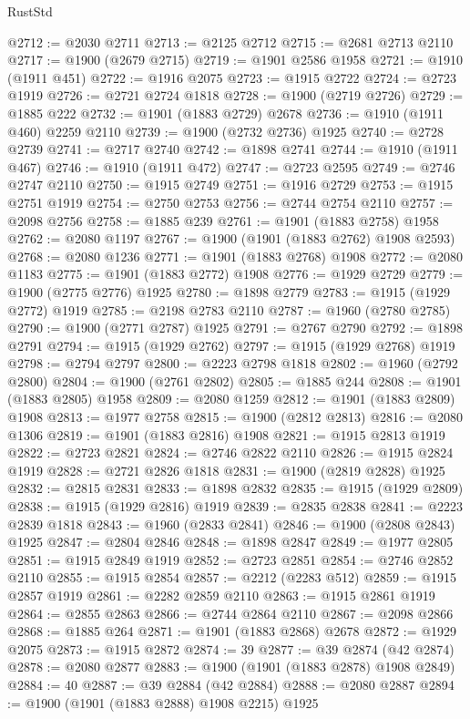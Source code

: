 \begin{lexlean}{RustStd}
\begin{coremodule}
@2712 := @2030 @2711
@2713 := @2125 @2712
@2715 := @2681 @2713 @2110
@2717 := @1900 (@2679 @2715)
@2719 := @1901 @2586 @1958
@2721 := @1910 (@1911 @451)
@2722 := @1916 @2075
@2723 := @1915 @2722
@2724 := @2723 @1919
@2726 := @2721 @2724 @1818
@2728 := @1900 (@2719 @2726)
@2729 := @1885 @222
@2732 := @1901 (@1883 @2729) @2678
@2736 := @1910 (@1911 @460) @2259 @2110
@2739 := @1900 (@2732 @2736) @1925
@2740 := @2728 @2739
@2741 := @2717 @2740
@2742 := @1898 @2741
@2744 := @1910 (@1911 @467)
@2746 := @1910 (@1911 @472)
@2747 := @2723 @2595
@2749 := @2746 @2747 @2110
@2750 := @1915 @2749
@2751 := @1916 @2729
@2753 := @1915 @2751 @1919
@2754 := @2750 @2753
@2756 := @2744 @2754 @2110
@2757 := @2098 @2756
@2758 := @1885 @239
@2761 := @1901 (@1883 @2758) @1958
@2762 := @2080 @1197
@2767 := @1900 (@1901 (@1883 @2762) @1908 @2593)
@2768 := @2080 @1236
@2771 := @1901 (@1883 @2768) @1908
@2772 := @2080 @1183
@2775 := @1901 (@1883 @2772) @1908
@2776 := @1929 @2729
@2779 := @1900 (@2775 @2776) @1925
@2780 := @1898 @2779
@2783 := @1915 (@1929 @2772) @1919
@2785 := @2198 @2783 @2110
@2787 := @1960 (@2780 @2785)
@2790 := @1900 (@2771 @2787) @1925
@2791 := @2767 @2790
@2792 := @1898 @2791
@2794 := @1915 (@1929 @2762)
@2797 := @1915 (@1929 @2768) @1919
@2798 := @2794 @2797
@2800 := @2223 @2798 @1818
@2802 := @1960 (@2792 @2800)
@2804 := @1900 (@2761 @2802)
@2805 := @1885 @244
@2808 := @1901 (@1883 @2805) @1958
@2809 := @2080 @1259
@2812 := @1901 (@1883 @2809) @1908
@2813 := @1977 @2758
@2815 := @1900 (@2812 @2813)
@2816 := @2080 @1306
@2819 := @1901 (@1883 @2816) @1908
@2821 := @1915 @2813 @1919
@2822 := @2723 @2821
@2824 := @2746 @2822 @2110
@2826 := @1915 @2824 @1919
@2828 := @2721 @2826 @1818
@2831 := @1900 (@2819 @2828) @1925
@2832 := @2815 @2831
@2833 := @1898 @2832
@2835 := @1915 (@1929 @2809)
@2838 := @1915 (@1929 @2816) @1919
@2839 := @2835 @2838
@2841 := @2223 @2839 @1818
@2843 := @1960 (@2833 @2841)
@2846 := @1900 (@2808 @2843) @1925
@2847 := @2804 @2846
@2848 := @1898 @2847
@2849 := @1977 @2805
@2851 := @1915 @2849 @1919
@2852 := @2723 @2851
@2854 := @2746 @2852 @2110
@2855 := @1915 @2854
@2857 := @2212 (@2283 @512)
@2859 := @1915 @2857 @1919
@2861 := @2282 @2859 @2110
@2863 := @1915 @2861 @1919
@2864 := @2855 @2863
@2866 := @2744 @2864 @2110
@2867 := @2098 @2866
@2868 := @1885 @264
@2871 := @1901 (@1883 @2868) @2678
@2872 := @1929 @2075
@2873 := @1915 @2872
@2874 := 39
@2877 := @39 @2874 (@42 @2874)
@2878 := @2080 @2877
@2883 := @1900 (@1901 (@1883 @2878) @1908 @2849)
@2884 := 40
@2887 := @39 @2884 (@42 @2884)
@2888 := @2080 @2887
@2894 := @1900 (@1901 (@1883 @2888) @1908 @2215) @1925

\end{coremodule}
\end{lexlean}
